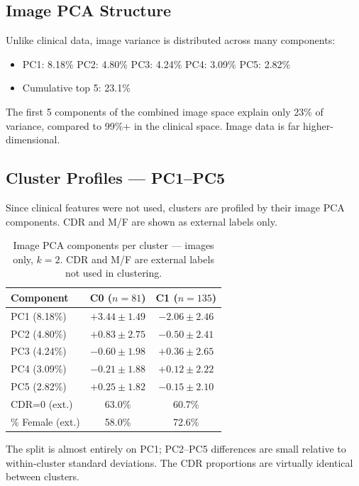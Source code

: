 \documentclass[12pt, a4paper]{article}
\begin{document}
\subsection{Image PCA Structure}

Unlike clinical data, image variance is distributed across many components:
\begin{itemize}[noitemsep]
    \item PC1: 8.18\% \quad PC2: 4.80\% \quad PC3: 4.24\% \quad PC4: 3.09\% \quad PC5: 2.82\%
    \item Cumulative top 5: 23.1\%
\end{itemize}

The first 5 components of the combined image space explain only 23\% of variance,
compared to 99\%+ in the clinical space. Image data is far higher-dimensional.

\subsection{Cluster Profiles — PC1–PC5}

Since clinical features were not used, clusters are profiled by their image PCA components.
CDR and M/F are shown as external labels only.

\begin{table}[H]
\centering
\caption{Image PCA components per cluster — images only, $k=2$.
CDR and M/F are external labels not used in clustering.}
\begin{tabular}{lcc}
\toprule
\textbf{Component} & \textbf{C0 ($n=81$)} & \textbf{C1 ($n=135$)} \\
\midrule
PC1 (8.18\%) & $+3.44 \pm 1.49$ & $-2.06 \pm 2.46$ \\
PC2 (4.80\%) & $+0.83 \pm 2.75$ & $-0.50 \pm 2.41$ \\
PC3 (4.24\%) & $-0.60 \pm 1.98$ & $+0.36 \pm 2.65$ \\
PC4 (3.09\%) & $-0.21 \pm 1.88$ & $+0.12 \pm 2.22$ \\
PC5 (2.82\%) & $+0.25 \pm 1.82$ & $-0.15 \pm 2.10$ \\
\midrule
CDR=0 (ext.) & 63.0\% & 60.7\% \\
\% Female (ext.) & 58.0\% & 72.6\% \\
\bottomrule
\end{tabular}
\end{table}

The split is almost entirely on PC1; PC2–PC5 differences are small relative to within-cluster
standard deviations. The CDR proportions are virtually identical between clusters.
\end{document}
